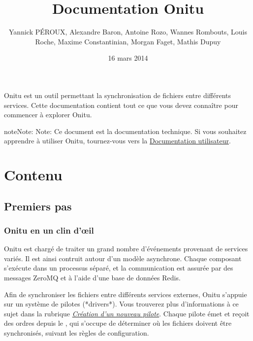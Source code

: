 \documentclass[letterpaper,10pt,english]{sphinxmanual}
\title{Documentation Onitu}
\date{16 mars 2014}
\author{Yannick PÉROUX, Alexandre Baron, Antoine Rozo, Wannes Rombouts, Louis Roche, Maxime Constantinian, Morgan Faget, Mathis Dupuy}
\begin{document}
\maketitle
\tableofcontents
{}\label{index::doc}


Onitu est un outil permettant la synchronisation de fichiers entre différents services. Cette documentation contient tout ce que vous devez connaître pour commencer à explorer Onitu.

\begin{notice}{note}{Note:}
Note: Ce document est la documentation technique. Si vous souhaitez apprendre à utiliser Onitu, tournez-vous vers la \href{http://github.com/onitu/onitu}{Documentation utilisateur}.
\end{notice}


\chapter{Contenu}
\label{index:onitu-version-technical-documentation}\label{index:content-table}\label{index:user-documentation}

\section{Premiers pas}
\label{intro:getting-started}\label{intro::doc}

\subsection{Onitu en un clin d'œil}
\label{intro:onitu-at-a-glance}
Onitu est chargé de traiter un grand nombre d'événements provenant de services variés. Il est ainsi contruit autour d'un modèle asynchrone. Chaque composant s'exécute dans un processus séparé, et la communication est assurée par des messages ZeroMQ et à l'aide d'une base de données Redis.

Afin de synchroniser les fichiers entre différents services externes, Onitu s'appuie sur un système de pilotes (*drivers*). Vous trouverez plus d'informations à ce sujet dans la rubrique {\hyperref[drivers::doc]{\emph{Création d'un nouveau pilote}}}. Chaque pilote émet et reçoit des ordres depuis le {\hyperref[components:onitu.referee.Referee]{}}, qui s'occupe de déterminer où les fichiers doivent être synchronisés, suivant les règles de configuration.
\end{document}
